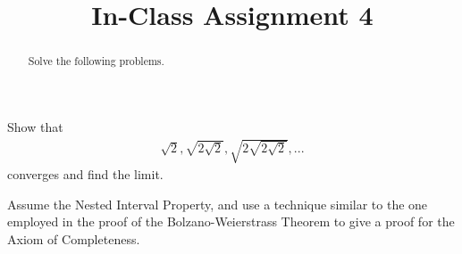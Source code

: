 \documentclass{ximera}
\begin{document}
    \title{In-Class Assignment 4}
    \begin{abstract} Solve the following problems. \end{abstract}
    \maketitle

\begin{exercise}
    Show that
    \begin{align}
        \sqrt{2}, \sqrt{2\sqrt{2}}, \sqrt{2\sqrt{2\sqrt{2}}}, ...
    \end{align}
    converges and find the limit.
\end{exercise}
\newpage

\begin{exercise}
    Assume the Nested Interval Property, and use a technique similar to the one employed in the proof of the Bolzano-Weierstrass Theorem to give a proof for the Axiom of Completeness.
\end{exercise}
\end{document}
